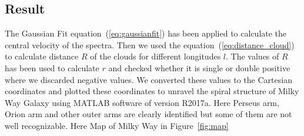 \documentclass[10pt,conference]{IEEEtran}
\begin{document}
\subsection{Result}

The Gaussian Fit equation~(\ref{eq:gaussianfit}) has been applied to calculate the central velocity of the spectra. Then we used the equation~(\ref{eq:distance_cloud}) to calculate distance $\mathit{R}$ of the clouds for different longitudes $\mathit{l}$. The values of $\mathit{R}$ has been used to calculate $\mathit{r}$ and checked whether it is single or double positive where we discarded negative values\cite{ThomasBensby2017,santo2013mapping}. We converted these values to the Cartesian coordinates and plotted these coordinates to unravel the spiral structure of Milky Way Galaxy using MATLAB software of version R2017a. Here Perseus arm, Orion arm and other outer arms are clearly identified but some of them are not well recognizable. Here Map of Milky Way in Figure~\ref{fig:map}
\end{document}
